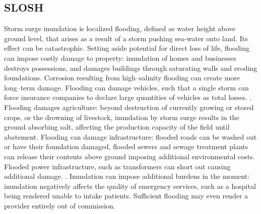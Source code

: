 \subsection{SLOSH}
Storm surge inundation is localized flooding, defined as water height above
    ground level, that arises as a result of a storm pushing sea-water onto
    land. Its effect can be catastrophic.  Setting aside potential 
    for direct loss of life, 
    flooding can impose costly damage to property: inundation of homes and 
    businesses destroys possessions, and damages buildings through saturating 
    walls and eroding foundations.  Corrosion resulting from high--salinity 
    flooding can create more long--term damage.\needcite  
    Flooding can damage vehicles, such that a single storm can force insurance 
    companies to declare large quantities of vehicles as total losses. 
    \needcite.  Flooding damages agriculture: beyond 
    destruction of currently growing or stored crops, or the drowning of 
    livestock, inundation by storm surge results in the ground absorbing salt, 
    affecting the production capacity of the field until abatement. Flooding can
    damage infrastructure: flooded roads can be washed out or have their 
    foundation damaged, flooded sewers and sewage treatment plants can release 
    their contents above ground imposing additional environmental costs.  
    Flooded power infrastructure, such as transformers can short out causing 
    additional damage. \citep{hutchings2021}.  Inundation can impose additional 
    burdens in the moment:  inundation negatively affects the quality of 
    emergency services, such as a hospital being rendered unable to intake 
    patients.  Sufficient flooding may even render a provider entirely out of 
    commission.

